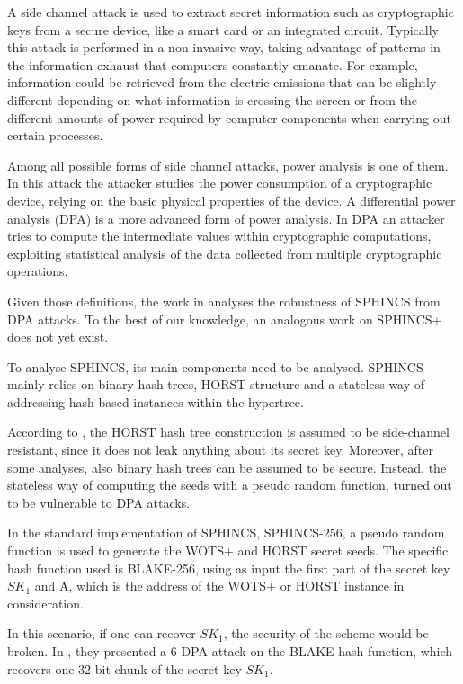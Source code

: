 \documentclass[a4paper,12pt]{article}
\begin{document}
A side channel attack is used to extract secret information such as cryptographic keys from a secure device, like a smart card or an integrated circuit. Typically this attack is performed in a non-invasive way, taking advantage of patterns in the information exhaust that computers constantly emanate. For example, information could be retrieved from the electric emissions that can be slightly different depending on what information is crossing the screen or from the different amounts of power required by computer components when carrying out certain processes.

Among all possible forms of side channel attacks, power analysis is one of them. In this attack the attacker studies the power consumption of a cryptographic device, relying on the basic physical properties of the device.
A differential power analysis (DPA) is a more advanced form of power analysis. In DPA an attacker tries to compute the intermediate values within cryptographic computations, exploiting statistical analysis of the data collected from multiple cryptographic operations.


Given those definitions, the work in \cite{11_poweranalysis} analyses the robustness of SPHINCS from DPA attacks. To the best of our knowledge, an analogous work on SPHINCS+ does not yet exist.

To analyse SPHINCS, its main components need to be analysed. SPHINCS mainly relies on binary hash trees, HORST structure and a stateless way of addressing hash-based instances within the hypertree.

According to \cite{11_poweranalysis}, the HORST hash tree construction is assumed to be side-channel resistant, since it does not leak anything about its secret key. Moreover, after some analyses, also binary hash trees can be assumed to be secure.
Instead, the stateless way of computing the seeds with a pseudo random function, turned out to be vulnerable to DPA attacks.

In the standard implementation of SPHINCS, SPHINCS-256, a pseudo random function is used to generate the WOTS+ and HORST secret seeds. The specific hash function used is BLAKE-256, using as input the first part of the secret key $SK_{1}$ and A, which is the address of the WOTS+ or HORST instance in consideration.

In this scenario, if one can recover $SK_{1}$, the security of the scheme would be broken. 
In \cite{11_poweranalysis}, they presented a 6-DPA attack on the BLAKE hash function, which recovers one 32-bit chunk of the secret key $SK_{1}$. 
\end{document}
